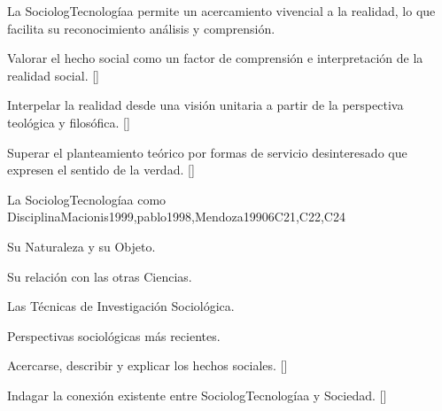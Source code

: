 \begin{syllabus}


\begin{justification}
La SociologTecnologíaa permite un acercamiento vivencial a la realidad, lo que facilita su reconocimiento análisis y comprensión.\end{justification}
\begin{goals}
\item Valorar el hecho social como un factor de comprensión e interpretación de la realidad social. [\Familiarity]
\item Interpelar la realidad desde una visión unitaria a partir de la perspectiva teológica y filosófica. [\Familiarity]
\item Superar el planteamiento teórico por formas de servicio desinteresado que expresen el sentido de la verdad. [\Familiarity]
\end{goals}

\begin{outcomes}
    \item {}
    \item {}
    \item {}
\end{outcomes}

\begin{competences}
    \item {}
    \item {} 
    \item {}
\end{competences}

\begin{unit}{}{La SociologTecnologíaa como Disciplina}{Macionis1999,pablo1998,Mendoza1990}{6}{C21,C22,C24}
\begin{topics}
    \item Su Naturaleza y su Objeto.
    \item Su relación con las otras Ciencias.
    \item Las Técnicas de Investigación Sociológica.
    \item Perspectivas sociológicas más recientes.
\end{topics}
\begin{learningoutcomes}
    \item Acercarse, describir y explicar los hechos sociales. [\Familiarity]
    \item Indagar la conexión existente entre SociologTecnologíaa y Sociedad. [\Familiarity]
\end{learningoutcomes}
\end{unit}


\end{syllabus}
